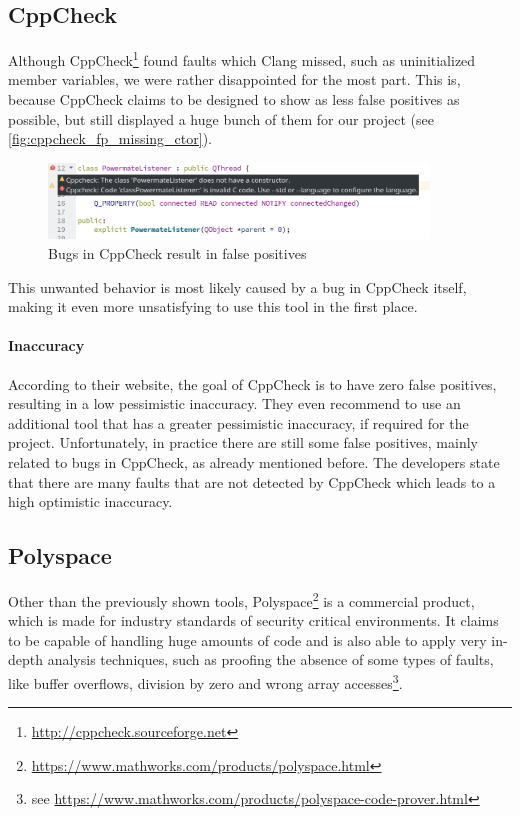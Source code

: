 \documentclass{scrreprt}
\begin{document}
\subsection{CppCheck} 

Although CppCheck\footnote{\url{http://cppcheck.sourceforge.net}} found faults which Clang missed, such as uninitialized member variables, we were rather disappointed for the most part. This is, because CppCheck claims to be designed to show as less false positives as possible, but still displayed a huge bunch of them for our project (see \vref{fig:cppcheck_fp_missing_ctor}).

\begin{figure}[h]
	\centering
	\includegraphics[width=0.9\textwidth]{img/cppcheck_fp_missing_ctor}
	\caption[Bugs in CppCheck]{Bugs in CppCheck result in false positives}
	\label{fig:cppcheck_fp_missing_ctor}
\end{figure}

This unwanted behavior is most likely caused by a bug in CppCheck itself, making it even more unsatisfying to use this tool in the first place.

\paragraph{Inaccuracy}

According to their website, the goal of CppCheck is to have zero false positives, resulting in a low pessimistic inaccuracy. They even recommend to use an additional tool that has a greater pessimistic inaccuracy, if required for the project. Unfortunately, in practice there are still some false positives, mainly related to bugs in CppCheck, as already mentioned before. The developers state that there are many faults that are not detected by CppCheck which leads to a high optimistic inaccuracy.

\subsection{Polyspace} 

Other than the previously shown tools, Polyspace\footnote{\url{https://www.mathworks.com/products/polyspace.html}} is a commercial product, which is made for industry standards of security critical environments. It claims to be capable of handling huge amounts of code and is also able to apply very in-depth analysis techniques, such as proofing the absence of some types of faults, like buffer overflows, division by zero and wrong array accesses\footnote{see \url{https://www.mathworks.com/products/polyspace-code-prover.html}}.
\end{document}
